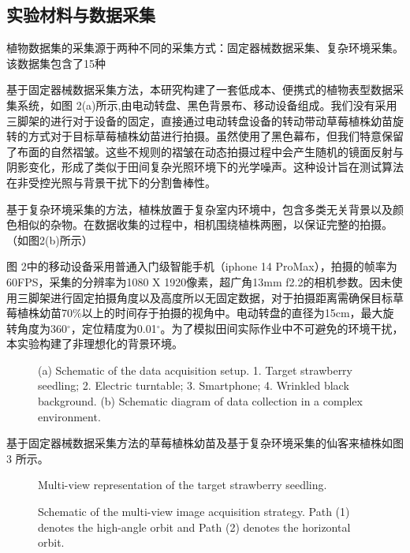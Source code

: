 \documentclass[preprint,12pt]{elsarticle}
\begin{document}
\subsection{实验材料与数据采集}

植物数据集的采集源于两种不同的采集方式：固定器械数据采集、复杂环境采集。该数据集包含了15种

基于固定器械数据采集方法，本研究构建了一套低成本、便携式的植物表型数据采集系统，如图 2(a)所示,由电动转盘、黑色背景布、移动设备组成。我们没有采用三脚架的进行对于设备的固定，直接通过电动转盘设备的转动带动草莓植株幼苗旋转的方式对于目标草莓植株幼苗进行拍摄。虽然使用了黑色幕布，但我们特意保留了布面的自然褶皱。这些不规则的褶皱在动态拍摄过程中会产生随机的镜面反射与阴影变化，形成了类似于田间复杂光照环境下的光学噪声。这种设计旨在测试算法在非受控光照与背景干扰下的分割鲁棒性。

基于复杂环境采集的方法，植株放置于复杂室内环境中，包含多类无关背景以及颜色相似的杂物。在数据收集的过程中，相机围绕植株两圈，以保证完整的拍摄。（如图2(b)所示）

图 2中的移动设备采用普通入门级智能手机（iphone 14 ProMax），拍摄的帧率为60FPS，采集的分辨率为1080 X 1920像素，超广角13mm f2.2的相机参数。因未使用三脚架进行固定拍摄角度以及高度所以无固定数据，对于拍摄距离需确保目标草莓植株幼苗70\%以上的时间存于拍摄的视角中。电动转盘的直径为15cm，最大旋转角度为360$^\circ$，定位精度为0.01$^\circ$。为了模拟田间实际作业中不可避免的环境干扰，本实验构建了非理想化的背景环境。

\begin{figure}[t]
\centering
\caption{(a) Schematic of the data acquisition setup. 1. Target strawberry seedling; 2. Electric turntable; 3. Smartphone; 4. Wrinkled black background. (b) Schematic diagram of data collection in a complex environment.}
\label{fig:image3}
\end{figure}

基于固定器械数据采集方法的草莓植株幼苗及基于复杂环境采集的仙客来植株如图 3 所示。

\begin{figure}[t]
\centering
\caption{Multi-view representation of the target strawberry seedling.}
\label{fig:image5}
\end{figure}

\begin{figure}[t]
\centering
\caption{Schematic of the multi-view image acquisition strategy. Path (1) denotes the high-angle orbit and Path (2) denotes the horizontal orbit.}
\label{fig:image7}
\end{figure}
\end{document}
